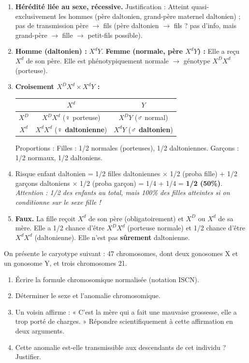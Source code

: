 \documentclass[11pt]{article}
\begin{document}
\begin{corrige}[Exercice 1]
\begin{enumerate}
    \item \textbf{Hérédité liée au sexe, récessive.} Justification : Atteint quasi-exclusivement les hommes (père daltonien, grand-père maternel daltonien) ; pas de transmission père $\to$ fils (père daltonien $\to$ fils ? pas d'info, mais grand-père $\to$ fille $\to$ petit-fils possible).
    \item \textbf{Homme (daltonien) :} $X^dY$. \textbf{Femme (normale, père $X^dY$) :} Elle a reçu $X^d$ de son père. Elle est phénotypiquement normale $\to$ génotype $X^DX^d$ (porteuse).
    \item \textbf{Croisement $X^DX^d \times X^dY$ :}
    \begin{center}
    \begin{tabular}{|c|c|c|}\hline
     & $X^d$ & $Y$ \\ \hline
    $X^D$ & $X^DX^d$ (♀ porteuse) & $X^DY$ (♂ normal) \\ \hline
    $X^d$ & $X^dX^d$ (\textbf{♀ daltonienne}) & $X^dY$ (\textbf{♂ daltonien}) \\ \hline
    \end{tabular}
    \end{center}
    Proportions : Filles : 1/2 normales (porteuses), 1/2 daltoniennes. Garçons : 1/2 normaux, 1/2 daltoniens.
    \item Risque enfant daltonien = 1/2 filles daltoniennes $\times$ 1/2 (proba fille) + 1/2 garçons daltoniens $\times$ 1/2 (proba garçon) = 1/4 + 1/4 = \textbf{1/2 (50\%)}. \textit{Attention : 1/2 des enfants au total, mais 100\% des filles atteintes si on conditionne sur le sexe fille !}
    \item \textbf{Faux.} La fille reçoit $X^d$ de son père (obligatoirement) et $X^D$ ou $X^d$ de sa mère. Elle a 1/2 chance d'être $X^DX^d$ (porteuse normale) et 1/2 chance d'être $X^dX^d$ (daltonienne). Elle n'est pas \textbf{sûrement} daltonienne.
\end{enumerate}
\end{corrige}

\begin{exercice}
On présente le caryotype suivant : 47 chromosomes, dont deux gonosomes X et un gonosome Y, et trois chromosomes 21.
\begin{enumerate}
    \item Écrire la formule chromosomique normalisée (notation ISCN).
    \item Déterminer le sexe et l'anomalie chromosomique.
    \item Un voisin affirme : « C'est la mère qui a fait une mauvaise grossesse, elle a trop porté de charges. » Répondre scientifiquement à cette affirmation en deux arguments.
    \item Cette anomalie est-elle transmissible aux descendants de cet individu ? Justifier.
\end{enumerate}
\end{exercice}
\end{document}
